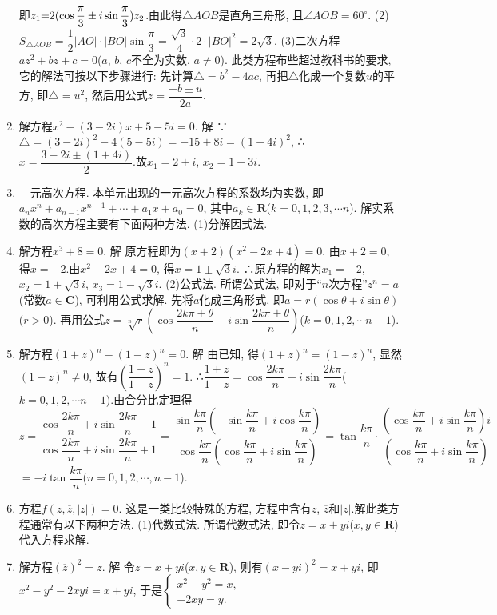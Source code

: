 \documentclass[10pt,a4paper]{article}
\begin{document}
\begin{enumerate}[1.]
即$z_1\text=2(\cos \dfrac{\pi }3\pm i\sin \dfrac{\pi }3)z_2$.由此得$\triangle AOB$是直角三舟形, 且$\angle AOB=60^{\circ }$.
(2)$S_{\triangle AOB}=\dfrac 12|AO|\cdot|BO|\sin \dfrac{\pi }3=\dfrac{\sqrt 3}4\cdot 2\cdot|BO|^2=2\sqrt 3$.
(3)二次方程$az^2+bz+c=0$($a$, $b$, $c$不全为实数, $a\ne 0$).
此类方程布些超过教科书的要求, 它的解法可按以下步骤进行:
先计算$\triangle =b^2-4ac$, 再把$\triangle$化成一个复数$u$的平方, 即$\triangle =u^2$,
然后用公式$z=\dfrac{-b\pm u}{2a}$.
\item 解方程$x^2-(3-2i)x+5-5i=0$.
解  ∵$\triangle =(3-2i)^2-4(5-5i)=-15+8i=(1+4i)^2$,
∴$x=\dfrac{3-2i\pm (1+4i)}2$.故$x_1=2+i$, $x_2=1-3i$.
\item —元高次方程.
本单元出现的一元高次方程的系数均为实数, 即$a_nx^n+a_{n-1}x^{n-1}+\cdots +a_1x+a_0=0$, 其中$a_k\in \mathbf{R}$($k=0,1,2,3,\cdots n$).
解实系数的高次方程主要有下面两种方法.
(1)分解因式法.
\item 解方程$x^3+8=0$.
解  原方程即为$(x+2)(x^2-2x+4)=0$.
由$x+2=0$, 得$x=-2$.由$x^2-2x+4=0$, 得$x=1\pm \sqrt 3i$.
∴原方程的解为$x_1=-2$, $x_2=1+\sqrt 3i$, $x_3=1-\sqrt 3i$.
(2)公式法.
所谓公式法, 即对于``$n$次方程''$z^n=a$(常数$a\in \mathbf{C}$), 可利用公式求解.
先将$a$化成三角形式, 即$a=r(\cos \theta +i\sin \theta)$($r>0$).
再用公式$z=\sqrt[n]r(\cos \dfrac{2k\pi +\theta }n+i\sin \dfrac{2k\pi +\theta }n)$($k=0,1,2,\cdots n-1$).
\item 解方程$(1+z)^n-(1-z)^n=0$.
解  由已知, 得$(1+z)^n=(1-z)^n$, 显然$(1-z)^n\ne 0$, 故有$(\dfrac{1+z}{1-z})^n=1$.
∴$\dfrac{1+z}{1-z}=\cos \dfrac{2k\pi }n+i\sin \dfrac{2k\pi }n$($k=0,1,2,\cdots n-1$).由合分比定理得
$z=\dfrac{\cos \dfrac{2k\pi }n+i\sin \dfrac{2k\pi }n-1}{\cos \dfrac{2k\pi }n+i\sin \dfrac{2k\pi }n+1}=\dfrac{\sin \dfrac{k\pi }n(-\sin \dfrac{k\pi }n+i\cos \dfrac{k\pi }n)}{\cos \dfrac{k\pi }n(\cos \dfrac{k\pi }n+i\sin \dfrac{k\pi }n)}=\tan \dfrac{k\pi }n\cdot \dfrac{(\cos \dfrac{k\pi }n+i\sin \dfrac{k\pi }n)i}{(\cos \dfrac{k\pi }n+i\sin \dfrac{k\pi }n)}$
 $=-i\tan \dfrac{k\pi }n$($n=0,1,2,\cdots ,n-1$).
\item 方程$f(z,\overline z,|z|)=0$.
这是一类比较特殊的方程, 方程中含有$z$, $\overline z$和$|z|$.解此类方程通常有以下两种方法.
(1)代数式法.
所谓代数式法, 即令$z=x+yi$($x,y\in \mathbf{R}$)代入方程求解.
\item 解方程$(\overline z)^2=z$.
解  令$z=x+yi$($x,y\in \mathbf{R}$), 则有$(x-yi)^2=x+yi$,
即$x^2-y^2-2xyi=x+yi$, 于是$\begin{cases} x^2-y^2=x, \\ -2xy=y. \end{cases}$

\end{enumerate}
\end{document}
